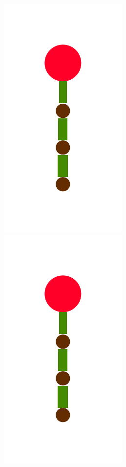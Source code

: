 \documentclass[a4paper,10pt]{article}
\begin{document}
\begin{figure}
{    \includegraphics[scale=.2]{./figures/4-2-3-recursion-post-3.pdf}
    \includegraphics[scale=.2]{./figures/4-2-3-recursion-post-4.pdf}
}
\end{figure}
\end{document}
